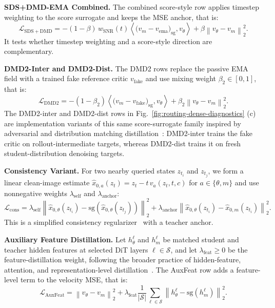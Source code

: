 \noindent\textbf{SDS+DMD-EMA Combined.}
The combined score-style row applies timestep weighting to the score surrogate and keeps the MSE anchor, that is:
\begin{equation}
  \mathcal{L}_{\mathrm{SDS+DMD}}
  =-(1-\beta)\,w_{\mathrm{SNR}}(t)
  \left\langle \bigl(v_m-v_{\mathrm{ema}}\bigr)_{\mathrm{sg}},v_\theta\right\rangle
  +\beta\left\|v_\theta-v_m\right\|_2^2.
  \label{eq:app-loss-sds-dmd}
\end{equation}
It tests whether timestep weighting and a score-style direction are complementary.

\noindent\textbf{DMD2-Inter and DMD2-Dist.}
The DMD2 rows replace the passive EMA field with a trained fake reference critic $v_{\mathrm{fake}}$ and use mixing weight $\beta_2\in[0,1]$, that is:
\begin{equation}
  \mathcal{L}_{\mathrm{DMD2}}
  =-(1-\beta_2)\left\langle \bigl(v_m-v_{\mathrm{fake}}\bigr)_{\mathrm{sg}},v_\theta\right\rangle
  +\beta_2\left\|v_\theta-v_m\right\|_2^2.
  \label{eq:app-loss-dmd2}
\end{equation}
The DMD2-inter and DMD2-dist rows in Fig.~\ref{fig:routing-dense-diagnostics} (c) are implementation variants of this same score-surrogate family inspired by adversarial and distribution matching distillation~\cite{sauer2024adversarial,sauer2024fast,yin2024one}: DMD2-inter trains the fake critic on rollout-intermediate targets, whereas DMD2-dist trains it on fresh student-distribution denoising targets.

\noindent\textbf{Consistency Variant.}
For two nearby queried states $z_{t_i}$ and $z_{t_j}$, we form a linear clean-image estimate $\hat{x}_{0,a}(z_t)=z_t-t\,v_a(z_t,t,c)$ for $a\in\{\theta,m\}$ and use nonnegative weights $\lambda_{\mathrm{self}}$ and $\lambda_{\mathrm{anchor}}$:
\begin{equation}
  \mathcal{L}_{\mathrm{cons}}
  = \lambda_{\mathrm{self}}
  \left\|\hat{x}_{0,\theta}(z_{t_i})-
      \mathrm{sg}\!\left(\hat{x}_{0,\theta}(z_{t_j})\right)\right\|_2^2
  +\lambda_{\mathrm{anchor}}
  \left\|\hat{x}_{0,\theta}(z_{t_i})-
      \hat{x}_{0,m}(z_{t_i})\right\|_2^2.
  \label{eq:app-loss-consistency}
\end{equation}
This is a simplified consistency regularizer~\cite{song2023consistency,kim2024consistency} with a teacher anchor.

\noindent\textbf{Auxiliary Feature Distillation.}
Let $h_\theta^\ell$ and $h_m^\ell$ be matched student and teacher hidden features at selected DiT layers $\ell\in\mathcal{S}$, and let $\lambda_{\mathrm{feat}}\ge0$ be the feature-distillation weight, following the broader practice of hidden-feature, attention, and representation-level distillation~\cite{romero2014fitnets,zagoruyko2016paying,heo2019comprehensive,ahn2019variational}. The AuxFeat row adds a feature-level term to the velocity MSE, that is:
\begin{equation}
  \mathcal{L}_{\mathrm{AuxFeat}}
  =\left\|v_\theta-v_m\right\|_2^2
  +\lambda_{\mathrm{feat}}\frac{1}{|\mathcal{S}|}
  \sum_{\ell\in\mathcal{S}}\left\|h_\theta^\ell-\mathrm{sg}(h_m^\ell)\right\|_2^2.
  \label{eq:app-loss-auxfeat}
\end{equation}

